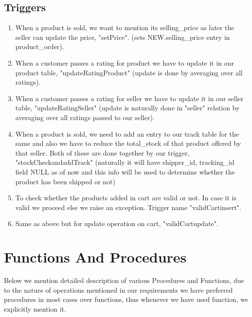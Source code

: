 \documentclass[a4paper,12pt]{article}
\begin{document}
\subsection{Triggers}
\begin{enumerate}
  \item When a product is sold, we want to mention its selling\_price as later the seller can update the price, "setPrice". (sets NEW.selling\_price entry in product\_order).
  \item When a customer passes a rating for product we have to update it in our product table, "updateRatingProduct" (update is done by averaging over all ratings).
  \item When a customer passes a rating for seller we have to update it in our seller table, "updateRatingSeller" (update is naturally done in "seller" relation by averaging over all ratings passed to our seller).
  \item When a product is sold, we need to add an entry to our track table for the same and also we have to reduce the total\_stock of that product offered by that seller. Both of these are done together by our trigger, "stockCheckandaddTrack" (naturally it will have shipper\_id, tracking\_id field NULL as of now and this info will be used to determine whether the product has been shipped or not)
  \item To check whether the products added in cart are valid or not. In case it is valid we proceed else we raise an exception. Trigger name "validCartinsert".
  \item Same as above but for update operation on cart, "validCartupdate".
\end{enumerate}
\newpage
\section{Functions And Procedures}
Below we mention detailed description of various Procedures and Functions, due to the nature of operations mentioned in our requirements we have preferred procedures in most cases over functions, thus whenever we have used function, we explicitly mention it.
\end{document}
